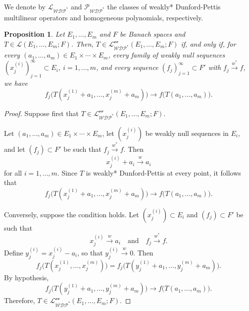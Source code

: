 \documentclass[12 pt]{article}%
\newtheorem{proposition}[theorem]{Proposition}
\newtheorem{final remark}[theorem]{Final Remark}
\begin{document}
We denote by $\mathcal{L_{WDP^{*}}}$ and $\mathcal{P_{WDP^{*}}}$ the classes of weakly* Dunford-Pettis multilinear operators and homogeneous polynomials, respectively.

\begin{proposition}
	Let $E_1,\dots, E_m$ and $F$ be Banach spaces and $T \in \mathcal{L}(E_1,\dots, E_m; F)$. Then, $T \in \mathcal{L_{WDP^*}^{\text{ev}}}(E_1,\dots, E_m; F)$ if, and only if, for every $(a_1,\dots, a_m) \in E_1\times\cdots\times E_m$, every family of weakly null sequences $(x_j^{(i)})_{j=1}^{\infty} \subset E_i$, $i=1,\dots,m$, and every sequence $(f_j)_{j=1}^{\infty} \subset F'$ with $f_j \overset{w^*}{\longrightarrow} f$, we have
	\begin{equation*}
		f_j\big(T(x_j^{(1)} + a_1,\dots, x_j^{(m)} + a_m)\big)
		\longrightarrow
		f\big(T(a_1,\dots, a_m)\big).
	\end{equation*}
\end{proposition}

\begin{proof}
	Suppose first that $T \in \mathcal{L_{WDP^*}^{\text{ev}}}(E_1,\dots, E_m; F)$.
	
	Let $(a_1,\dots,a_m)\in E_1\times\cdots\times E_m$, let $(x_j^{(i)})$ be weakly null sequences in $E_i$, and let $(f_j) \subset F'$ be such that $f_j \overset{w^*}{\longrightarrow} f$. Then
	\[
	x_j^{(i)} + a_i \overset{w}{\longrightarrow} a_i
	\]
	for all $i=1,\dots,m$. Since $T$ is weakly* Dunford-Pettis at every point, it follows that
	\[
	f_j\big(T(x_j^{(1)} + a_1,\dots, x_j^{(m)} + a_m)\big)
	\longrightarrow
	f\big(T(a_1,\dots, a_m)\big).
	\]
	
	Conversely, suppose the condition holds. Let $(x_j^{(i)}) \subset E_i$ and $(f_j) \subset F'$ be such that
	\[
	x_j^{(i)} \overset{w}{\longrightarrow} a_i
	\quad \text{and} \quad
	f_j \overset{w^*}{\longrightarrow} f.
	\]
	Define $y_j^{(i)} = x_j^{(i)} - a_i$, so that $y_j^{(i)} \overset{w}{\longrightarrow} 0$. Then
	\[
	f_j\big(T(x_j^{(1)},\dots,x_j^{(m)})\big)
	=
	f_j\big(T(y_j^{(1)} + a_1,\dots,y_j^{(m)} + a_m)\big).
	\]
	By hypothesis,
	\[
	f_j\big(T(y_j^{(1)} + a_1,\dots,y_j^{(m)} + a_m)\big)
	\longrightarrow
	f\big(T(a_1,\dots,a_m)\big).
	\]
	Therefore, $T \in \mathcal{L_{WDP^*}^{\text{ev}}}(E_1,\dots,E_m;F)$.
\end{proof}

\end{document}
